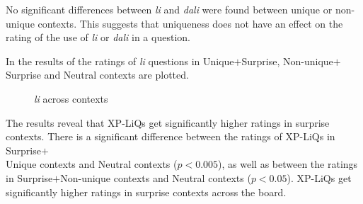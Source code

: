 \documentclass[output=paper,
colorlinks,
citecolor=brown,
newtxmath
]{langscibook}
\begin{document}
\noindent No significant differences between \textit{li} and \textit{dali} were found between unique or non-unique contexts. This suggests that uniqueness does not have an effect on the rating of the use of \textit{li} or \textit{dali} in a question.

In  the results of the ratings of \textit{li} questions in Unique$+$Surprise, Non-unique$+$Surprise and Neutral contexts are plotted.



\begin{figure}
    \caption{\textit{li} across contexts}
    \label{lipic}
\end{figure}

\noindent The results reveal that XP-LiQs get significantly higher ratings in surprise contexts. There is a significant difference between the ratings of XP-LiQs in Surprise$+$\\Unique contexts and Neutral contexts ($p<0.005$), as well as between the ratings in Surprise$+$Non-unique contexts and Neutral contexts ($p<0.05$). XP-LiQs get significantly higher ratings in surprise contexts across the board.
\end{document}

